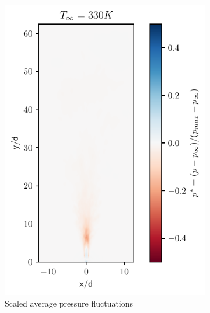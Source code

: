 \begin{figure}[htbp!]
\begin{subfigure}{0.25\textwidth}
	\includegraphics[scale=.65]{figures/Plots/vertical/330/pressure_scaled_vert_avg_330.pdf}
	\caption{Scaled average pressure fluctuations} \label{330_pressure_3}
\end{subfigure}
\hfill
\begin{subfigure}{0.25\textwidth}
	\centering

\end{subfigure}
\end{figure}
